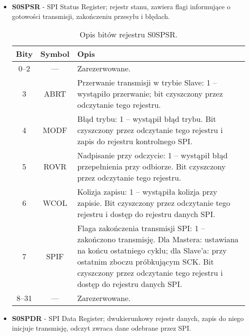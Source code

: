 \begin{itemize}
    \item \textbf{S0SPSR} - SPI Status Register; rejestr stanu, zawiera flagi informujące o gotowości transmisji, zakończeniu przesyłu i błędach.

\begin{table}[H]
\centering
\caption{Opis bitów rejestru S0SPSR.}
\vspace{0.5em}
\renewcommand{\arraystretch}{1.2}
\begin{tabular}{|c|c|p{9.5cm}|}
\hline
\textbf{Bity} & \textbf{Symbol} & \textbf{Opis} \\
\hline
0–2     & —        & Zarezerwowane.\\
\hline
3       & ABRT     & Przerwanie transmisji w trybie Slave: 1 – wystąpiło przerwanie; bit czyszczony przez odczytanie tego rejestru. \\
\hline
4       & MODF     & Błąd trybu: 1 – wystąpił błąd trybu. Bit czyszczony przez odczytanie tego rejestru i zapis do rejestru kontrolnego SPI. \\
\hline
5       & ROVR     & Nadpisanie przy odczycie: 1 – wystąpił błąd przepełnienia przy odbiorze. Bit czyszczony przez odczytanie tego rejestru. \\
\hline
6       & WCOL     & Kolizja zapisu: 1 – wystąpiła kolizja przy zapisie. Bit czyszczony przez odczytanie tego rejestru i dostęp do rejestru danych SPI. \\
\hline
7       & SPIF     & Flaga zakończenia transmisji SPI: 1 – zakończono transmisję. Dla Mastera: ustawiana na końcu ostatniego cyklu; dla Slave’a: przy ostatnim zboczu próbkującym SCK. Bit czyszczony przez odczytanie tego rejestru i dostęp do rejestru danych SPI. \\
\hline
8–31    & —        & Zarezerwowane.\\
\hline
\end{tabular}
\end{table}

    
    \item \textbf{S0SPDR} - SPI Data Register; dwukierunkowy rejestr danych, zapis do niego inicjuje transmisję, odczyt zwraca dane odebrane przez SPI.


\end{itemize}
